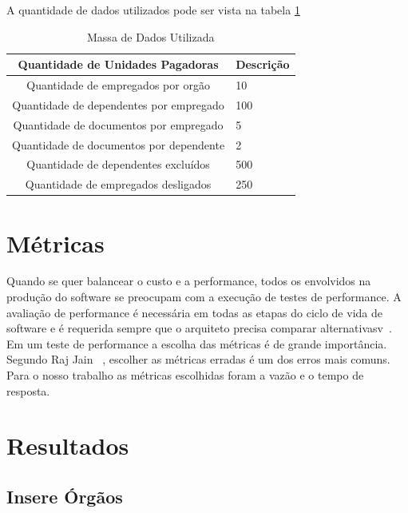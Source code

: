 A quantidade de dados utilizados pode ser vista na tabela \ref{tab:massadadosutil}

\begin{table}
	\caption{Massa de Dados Utilizada}
	\begin{center}
	\begin{tabularx}{\textwidth}{ | c | X | }
	\hline
		\textbf{Quantidade de Unidades Pagadoras} & \multicolumn{1}{c|}{\textbf{Descrição}} \\
	\hline
		Quantidade de empregados por orgão & 10\\
	\hline 
		Quantidade de dependentes por empregado & 100 \\
	\hline
		Quantidade de documentos por empregado & 5\\
	\hline
		Quantidade de documentos por dependente & 2\\
	\hline
	\hline
		Quantidade de dependentes excluídos & 500\\
	\hline
	\hline
		Quantidade de empregados desligados & 250\\
	\hline
	\end {tabularx}
	\end{center}
	\label{tab:massadadosutil}
\end{table}

\section{Métricas}

Quando se quer balancear o custo e a performance, todos os envolvidos na produção do software se preocupam com a execução de testes de performance. A avaliação de performance é necessária em todas as etapas do ciclo de vida de software e é requerida sempre que o arquiteto precisa comparar alternativasv~\cite{rajjain}. Em um teste de performance a escolha das métricas é de grande importância. Segundo Raj Jain ~\cite{rajjain}, escolher as métricas erradas é um dos erros mais comuns. Para o nosso trabalho as métricas escolhidas foram a vazão e o tempo de resposta.

\section{Resultados}

\subsection{Insere Órgãos}

